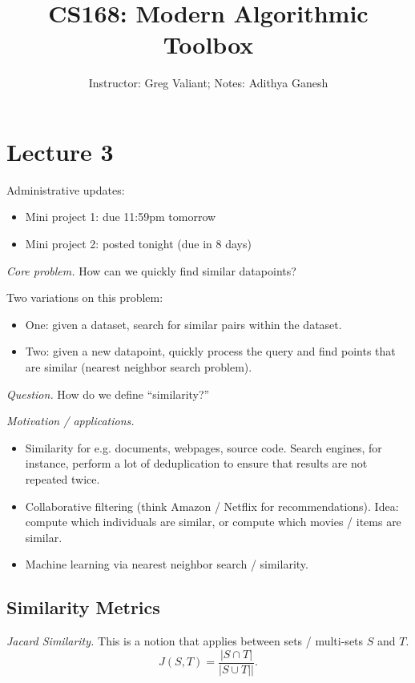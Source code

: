 \documentclass[12pt]{article}
\title{CS168: Modern Algorithmic Toolbox}
\author{Instructor: Greg Valiant; Notes: Adithya Ganesh}
\begin{document}
\maketitle
\tableofcontents

\section{Lecture 3}

Administrative updates:
\begin{itemize}
  \item Mini project 1: due 11:59pm tomorrow
  \item Mini project 2: posted tonight (due in 8 days)
\end{itemize}


{\it Core problem.} How can we quickly find similar datapoints?

Two variations on this problem:

\begin{itemize}
  \item One: given a dataset, search for similar pairs within the dataset.
  \item Two: given a new datapoint, quickly process the query and find points that are similar (nearest neighbor search problem).
\end{itemize}

{\it Question.} How do we define ``similarity?''

{\it Motivation / applications.}
\begin{itemize}
  \item Similarity for e.g. documents, webpages, source code.  Search engines, for instance, perform a lot of deduplication to ensure that results are not repeated twice.
  \item Collaborative filtering (think Amazon / Netflix for recommendations).  Idea: compute which individuals are similar, or compute which movies / items are similar.
  \item Machine learning via nearest neighbor search / similarity.
\end{itemize}

\subsection{Similarity Metrics}

{\it Jacard Similarity.} This is a notion that applies between sets / multi-sets $S$ and $T$.
\[
  J(S, T) = \frac{|S \cap T |}{|S \cup T||}.
\]
\end{document}
